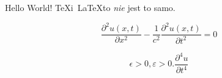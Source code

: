 \documentclass[a4paper, 12pt]{article}
\newcommand{\pr}{\partial
}
\newcommand{\fr}{\frac}
\newcommand{\pd}[3]{\fr{ \pr^{ #1 } { #2 } }{ \pr { #3 }^{ #1 } }}
\begin{document}
Hello World! \TeX i~\LaTeX to \emph{nie} jest to samo.

\begin{equation}
  \label{eq:1}
  \frac{ \partial^{ 2 } u( x, t ) }{ \partial x^{ 2 } }
  - \frac{ 1 }{ c^{ 2 } } \frac{ \partial^{ 2 } u( x, t ) }{ \partial t^{ 2 } }
  = 0
\end{equation}

\begin{equation}
  \label{eq:2}
  \epsilon > 0, \varepsilon > 0. \pd{ 4 }{ u }{ t }
\end{equation}
\end{document}
